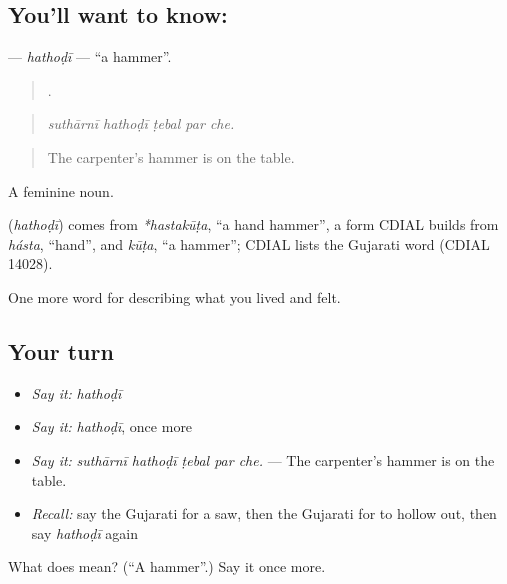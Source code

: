 \subsection*{You'll want to know: }
\textbf{} — \emph{hathoḍī} — \textquotedblleft{}a hammer\textquotedblright{}.

\begin{quote}
    .
\end{quote}

\begin{quote}
\emph{suthārnī hathoḍī ṭebal par che.}
\end{quote}

\begin{quote}
The carpenter's hammer is on the table.
\end{quote}

A feminine noun.

\begin{cousinweb}
\textbf{} (\emph{hathoḍī}) comes from \emph{*hastakūṭa}, \textquotedblleft{}a hand hammer\textquotedblright{}, a form CDIAL builds from \emph{hásta}, \textquotedblleft{}hand\textquotedblright{}, and \emph{kūṭa}, \textquotedblleft{}a hammer\textquotedblright{}; CDIAL lists the Gujarati word (CDIAL 14028).
\end{cousinweb}

\begin{grammarlens}[title={What you've built}]
One more word for describing what you lived and felt.
\end{grammarlens}

\subsection*{Your turn}
\begin{itemize}
\raggedright
  \item \emph{Say it:} \emph{hathoḍī}
  \item \emph{Say it:} \emph{hathoḍī}, once more
  \item \emph{Say it:} \emph{suthārnī hathoḍī ṭebal par che.} — The carpenter's hammer is on the table.
  \item \emph{Recall:} say the Gujarati for a saw, then the Gujarati for to hollow out, then say \emph{hathoḍī} again
\end{itemize}

\begin{tcolorbox}[breakable,colback=teal!4,colframe=teal!35!black,title={Before you move on}]
What does  mean? (\textquotedblleft{}A hammer\textquotedblright{}.) Say it once more.
\end{tcolorbox}
